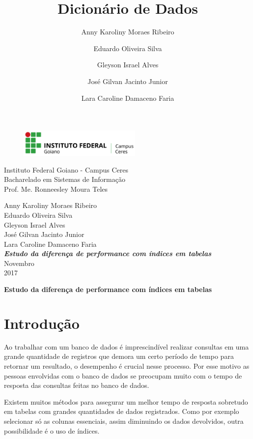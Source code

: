 \documentclass[12pt,a4paper]{article}
\title{Dicionário de Dados}
\author{Anny Karoliny Moraes Ribeiro \and Eduardo Oliveira Silva \and Gleyson Israel Alves \and José Gilvan Jacinto Junior \and Lara Caroline Damaceno Faria}
\begin{document}
\begin{titlepage}
\begin{center}
\begin{figure}[htb]
	\label{figura:LogoIF}
	\centering
	\includegraphics[width=6cm]{recursos/imagens/logo.png} 
\end{figure}
Instituto Federal Goiano - Campus Ceres\\
Bacharelado em Sistemas de Informação\\
Prof. Me. Ronneesley Moura Teles\\\vspace{1cm}

Anny Karoliny Moraes Ribeiro\\Eduardo Oliveira Silva\\Gleyson Israel Alves\\José Gilvan Jacinto Junior\\Lara Caroline Damaceno Faria\\\vspace{6.0cm}
\textit{\textbf{\Large{Estudo da diferença de performance com índices em tabelas}}}\\\vspace{10cm}
Novembro\\
2017\\
\end{center}
\end{titlepage}
\tableofcontents
\newpage
\begin{center}
\textbf{\Large{Estudo da diferença de performance com índices em tabelas}}\\\vspace{0.5cm}
\end{center}
\section{Introdução}

Ao trabalhar com um banco de dados é imprescindível realizar consultas em uma grande quantidade de registros que demora um certo período de tempo para retornar um resultado, o desempenho é crucial nesse processo. Por esse motivo as pessoas envolvidas com o banco de dados se preocupam muito com o tempo de resposta das consultas feitas no banco de dados.

Existem muitos métodos para assegurar um melhor tempo de resposta sobretudo em tabelas com grandes quantidades de dados registrados. Como por exemplo selecionar só as colunas essenciais, assim diminuindo os dados devolvidos, outra possibilidade é o uso de índices.
\end{document}
